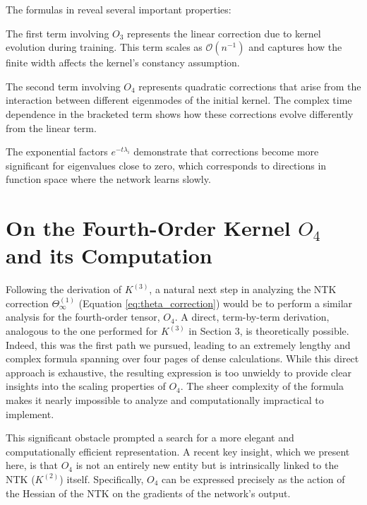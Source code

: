 \documentclass[a4paper]{article}
\begin{document}
\begin{remark}
The formulas in  reveal several important properties:

The first term involving $O_3$ represents the linear correction due to kernel evolution during training. This term scales as $\mathcal{O}(n^{-1})$ and captures how the finite width affects the kernel's constancy assumption.

The second term involving $O_4$ represents quadratic corrections that arise from the interaction between different eigenmodes of the initial kernel. The complex time dependence in the bracketed term shows how these corrections evolve differently from the linear term.

The exponential factors $e^{-t\lambda_i}$ demonstrate that corrections become more significant for eigenvalues close to zero, which corresponds to directions in function space where the network learns slowly.
\end{remark}





\section{On the Fourth-Order Kernel $O_4$ and its Computation}

Following the derivation of $K^{(3)}$, a natural next step in analyzing the NTK correction $\Theta^{(1)}_\infty$ (Equation \ref{eq:theta_correction}) would be to perform a similar analysis for the fourth-order tensor, $O_4$. A direct, term-by-term derivation, analogous to the one performed for $K^{(3)}$ in Section 3, is theoretically possible. Indeed, this was the first path we pursued, leading to an extremely lengthy and complex formula spanning over four pages of dense calculations. While this direct approach is exhaustive, the resulting expression is too unwieldy to provide clear insights into the scaling properties of $O_4$. The sheer complexity of the formula makes it nearly impossible to analyze and computationally impractical to implement.

This significant obstacle prompted a search for a more elegant and computationally efficient representation. A recent key insight, which we present here, is that $O_4$ is not an entirely new entity but is intrinsically linked to the NTK ($K^{(2)}$) itself. Specifically, $O_4$ can be expressed precisely as the action of the Hessian of the NTK on the gradients of the network's output.
\end{document}

